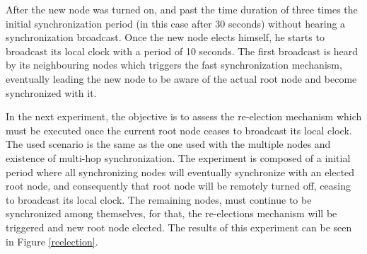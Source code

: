\documentclass[11pt,a4]{article}
\begin{document}
\begin{multicols}{2}
After the new node was turned on, and past the time duration of three times the initial synchronization period (in this case after 30 seconds) without hearing a synchronization broadcast. Once the new node elects himself, he starts to broadcast its local clock with a period of 10 seconds. The first broadcast is heard by its neighbouring nodes which triggers the fast synchronization mechanism, eventually leading the new node to be aware of the actual root node and become synchronized with it. 

In the next experiment, the objective is to assess the re-election mechanism which must be executed once the current root node ceases to broadcast its local clock. The used scenario is the same as the one used with the multiple nodes and existence of multi-hop synchronization. The experiment is composed of a initial period where all synchronizing nodes will eventually synchronize with an elected root node, and consequently that root node will be remotely turned off, ceasing to broadcast its local clock. The remaining nodes, must continue to be synchronized among themselves, for that, the re-elections mechanism will be triggered and new root node elected. The results of this experiment can be seen in Figure \ref{reelection}.


\end{multicols}
\end{document}
